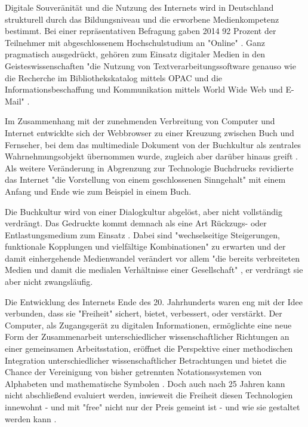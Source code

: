Digitale Souveränität und die Nutzung des Internets wird in Deutschland strukturell durch das Bildungsniveau und die erworbene Medienkompetenz bestimmt. Bei einer repräsentativen Befragung gaben 2014 92 Prozent der Teilnehmer mit abgeschlossenem Hochschulstudium an "Online" \cite{nonliner_2014}. Ganz pragmatisch ausgedrückt, gehören zum Einsatz digitaler Medien in den Geisteswissenschaften "die Nutzung von Textverarbeitungssoftware genauso wie die Recherche im Bibliothekskatalog mittels OPAC und die Informationsbeschaffung und Kommunikation mittels World Wide Web und E-Mail" \cite{naeder_2010_open}.

Im Zusammenhang mit der zunehmenden Verbreitung von Computer und Internet entwicklte sich der Webbrowser zu einer Kreuzung zwischen Buch und Fernseher, bei dem das multimediale Dokument von der Buchkultur als zentrales Wahrnehmungsobjekt übernommen wurde, zugleich aber darüber hinaus greift \cite{Warnke_2011}. Als weitere Veränderung in Abgrenzung zur Technologie Buchdrucks revidierte das Internet "die Vorstellung von einem geschlossenen Sinngehalt" \cite{sandbothe_2000_pragmatische} mit einem Anfang und Ende wie zum Beispiel in einem Buch.

Die Buchkultur wird von einer Dialogkultur abgelöst, aber nicht vollständig verdrängt. Das Gedruckte kommt demnach als eine Art Rückzugs- oder Entlastungsmedium zum Einsatz \cite{hagner_2015_sache_buches}. Dabei sind "wechselseitige Steigerungen, funktionale Kopplungen und vielfältige Kombinationen" zu erwarten und der damit einhergehende Medienwandel verändert vor allem "die bereits verbreiteten Medien und damit die medialen Verhältnisse einer Gesellschaft" \cite{Koenen_1997}, er verdrängt sie aber nicht zwangsläufig.

Die Entwicklung des Internets Ende des 20. Jahrhunderts waren eng mit der Idee verbunden, dass sie "Freiheit" sichert, bietet, verbessert, oder verstärkt. Der Computer, als Zugangsgerät zu digitalen Informationen, ermöglichte eine neue Form der Zusammenarbeit unterschiedlicher wissenschaftlicher Richtungen an einer gemeinsamen Arbeitsstation, eröffnet die Perspektive einer methodischen Integration unterschiedlicher wissenschaftlicher Betrachtungen und bietet die Chance der Vereinigung von bisher getrennten Notationssystemen von Alphabeten und mathematische Symbolen \cite{kittler_2004}. Doch auch nach 25 Jahren kann nicht abschließend evaluiert werden, inwieweit die Freiheit diesen Technologien innewohnt - und mit "free" nicht nur der Preis gemeint ist \cite{stallman2002} - und wie sie gestaltet werden kann \cite{kelty_2014_freedom}.

